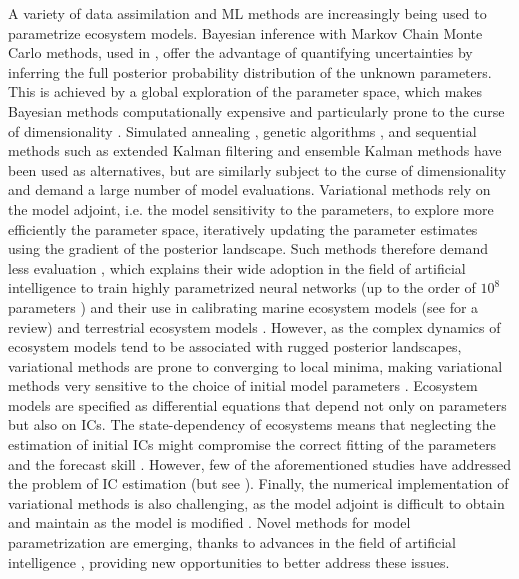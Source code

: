 A variety of data assimilation and ML methods are increasingly being used to parametrize ecosystem models.
%
Bayesian inference with Markov Chain Monte Carlo methods, used in \cite{Lignell2013,Higgins2010,Xu2006,Fiechter2013,Rosenbaum2019}, offer the advantage of quantifying uncertainties by inferring the full posterior probability distribution of the unknown parameters. This is achieved by a global exploration of the parameter space, which makes Bayesian methods computationally expensive and particularly prone to the curse of dimensionality \cite{Gosh2021}.
%
Simulated annealing \cite{Matear1995}, genetic algorithms \cite{Ward2010}, and sequential methods such as extended Kalman filtering and ensemble Kalman methods \cite{Bertino2003,Doron2013,Gharamti2017} have been used as alternatives, but are similarly subject to the curse of dimensionality and demand a large number of model evaluations.
%
Variational methods rely on the model adjoint, i.e. the model sensitivity to the parameters, to explore more efficiently the parameter space, iteratively updating the parameter estimates using the gradient of the posterior landscape. Such methods therefore demand less evaluation \cite{Schartau2017}, which explains their wide adoption in the field of artificial intelligence to train highly parametrized neural networks (up to the order of $10^8$ parameters \cite{NIPS2017_3f5ee243}) and their use in calibrating marine ecosystem models \cite{Fennel2001,Spitz1998,Xiao2014,Pelc2012} (see \cite{Schartau2017} for a review) and terrestrial ecosystem models \cite{Zhu2015,DeLong2014,Curtsdotter2019}. 
%
However, as the complex dynamics of ecosystem models tend to be associated with rugged posterior landscapes, variational methods are prone to converging to local minima, making variational methods very sensitive to the choice of initial model parameters \cite{Gabor2015,Schartau2017}.
%
Ecosystem models are specified as differential equations that depend not only on parameters but also on ICs. The state-dependency of ecosystems means that neglecting the estimation of initial ICs might compromise the correct fitting of the parameters and the forecast skill \cite{Lignell2013}. However, few of the aforementioned studies have addressed the problem of IC estimation (but see \cite{Pelc2012}). 
%
Finally, the numerical implementation of variational methods is also challenging, as the model adjoint is difficult to obtain and maintain as the model is modified \cite{Lawson1995,Pelc2012,Gharamti2017}. 
%
Novel methods for model parametrization are emerging, thanks to advances in the field of artificial intelligence \cite{Willard2020,Kashinath2021,Alber2019,Peng2021}, providing new opportunities to better address these issues.
    
